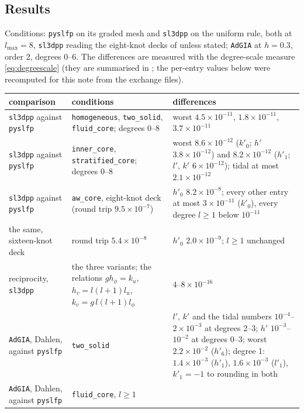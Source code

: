 \documentclass[11pt]{article}
\numberwithin{equation}{section}
\newcommand{\code}[1]{\texttt{#1}}
\begin{document}
\subsection{Results}
\label{sec:e2-results}

Conditions: \code{pyslfp} on its graded mesh and \code{sl3dpp} on the
uniform rule, both at $l_{\max}=8$, \code{sl3dpp} reading the eight-knot
decks of  unless stated; \code{AdGIA} at $h=0.3$,
order 2, degrees 0--6. The differences are measured with the degree-scale measure
\eqref{eq:degreescale} (they are summarised in
; the per-entry values below were
recomputed for this note from the exchange files).
\begin{center}
\small
\begin{tabular}{@{}P{3.9cm}P{4.4cm}P{6.9cm}@{}}
\toprule
comparison & conditions & differences \\
\midrule
\code{sl3dpp} against \code{pyslfp} & \code{homogeneous},
\code{two\_solid}, \code{fluid\_core}; degrees 0--8 & worst
$4.5\times10^{-11}$, $1.8\times10^{-11}$, $3.7\times10^{-11}$ \\ \addlinespace
\code{sl3dpp} against \code{pyslfp} & \code{inner\_core},
\code{stratified\_core}; degrees 0--8 & worst $8.6\times10^{-12}$ ($k'_0$;
$h'$ $3.8\times10^{-12}$) and $8.2\times10^{-12}$ ($h'_1$; $l'$, $k'$
$6\times10^{-12}$); tidal at most $2.1\times10^{-12}$ \\ \addlinespace
\code{sl3dpp} against \code{pyslfp} & \code{aw\_core}, eight-knot deck
(round trip $9.5\times10^{-7}$) & $h'_0$ $8.2\times10^{-8}$; every other
entry at most $3\times10^{-11}$ ($k'_0$), every degree $l\ge1$ below
$10^{-11}$ \\ \addlinespace
the same, sixteen-knot deck & round trip $5.4\times10^{-8}$ & $h'_0$
$2.0\times10^{-9}$; $l\ge1$ unchanged \\ \addlinespace
reciprocity, \code{sl3dpp} & the three variants; the relations $gh_\phi=k_u$,
$h_v=l(l+1)l_u$, $k_v=g\,l(l+1)l_\phi$ & $4$--$8\times10^{-16}$ \\
\addlinespace
\code{AdGIA}, Dahlen, against \code{pyslfp} & \code{two\_solid} &
$l'$, $k'$ and the tidal numbers $10^{-4}$--$2\times10^{-3}$ at degrees 2--3;
$h'$ $10^{-3}$--$10^{-2}$ at degrees 0--3; worst $2.2\times10^{-2}$
($h'_6$); degree 1: $1.4\times10^{-3}$ ($h'_1$), $1.6\times10^{-3}$
($l'_1$), $k'_1=-1$ to rounding in both \\ \addlinespace
\code{AdGIA}, Dahlen, against \code{pyslfp} & \code{fluid\_core}, $l\ge1$ &

\end{tabular}
\end{center}
\end{document}
